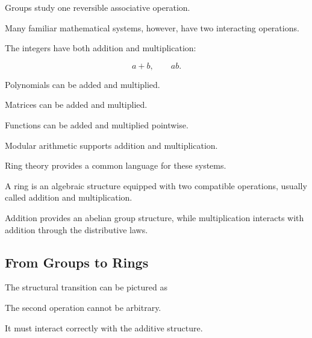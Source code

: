 Groups study one reversible associative operation.

Many familiar mathematical systems, however, have two interacting operations.

The integers have both addition and multiplication:

\[ a+b,\qquad ab. \]

Polynomials can be added and multiplied.

Matrices can be added and multiplied.

Functions can be added and multiplied pointwise.

Modular arithmetic supports addition and multiplication.

Ring theory provides a common language for these systems.

\begin{conceptbox}
A ring is an algebraic structure equipped with two compatible operations,
usually called addition and multiplication.

Addition provides an abelian group structure, while multiplication interacts
with addition through the distributive laws.
\end{conceptbox}

\subsection{From Groups to Rings}
\label{subsec:groups-to-rings}

The structural transition can be pictured as

\begin{center}
\end{center}

The second operation cannot be arbitrary.

It must interact correctly with the additive structure.

